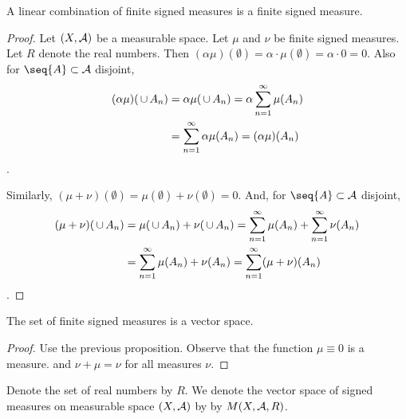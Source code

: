\begin{prop}
A linear combination of
finite signed measures is
a finite signed measure.
\begin{proof}
Let $(X,\mathcal{A})$ be a measurable space.
Let $\mu$ and $\nu$ be finite signed measures.
Let $R$ denote the real numbers.
Then $(\alpha\mu)(\emptyset) = \alpha \cdot \mu(\emptyset) = \alpha \cdot 0 = 0$.
Also for $\seq{A} \subset \SA$ disjoint,
$$
\begin{aligned}
  (\alpha\mu)(\,\cup\, A_n) &= \alpha \mu(\,\cup\, A_n)
  = \alpha \sum_{n = 1}^{\infty} \mu(A_n) \\ &= \sum_{n = 1}^{\infty} \alpha \mu(A_n) = (\alpha\mu)(A_n)
\end{aligned}
$$.

Similarly,
$(\mu + \nu)(\emptyset) = \mu(\emptyset) + \nu(\emptyset) = 0$.
And,
for $\seq{A} \subset \SA$ disjoint,
$$
\begin{aligned}
  (\mu + \nu)(\,\cup\, A_n) &= \mu(\,\cup\, A_n) + \nu(\,\cup\, A_n)
  = \sum_{n = 1}^{\infty} \mu(A_n) +
  \sum_{n = 1}^{\infty} \nu(A_n) \\
  &= \sum_{n = 1}^{\infty} \mu(A_n) + \nu(A_n)
  = \sum_{n = 1}^{\infty} (\mu + \nu)(A_n)
\end{aligned}
$$.
\end{proof}
\end{prop}


\begin{prop}
  The set of finite signed
  measures is a vector space.
  \begin{proof}
    Use the previous proposition.
    Observe that the function
    $\mu \equiv 0$ is a measure.
    and $\nu + \mu = \nu$ for
    all measures $\nu$.
  \end{proof}
\end{prop}

Denote the set of real
numbers by $R$.
We denote the vector
space of signed measures
on measurable space
$(X, \mathcal{A})$ by
by $M(X, \mathcal{A}, R)$.
\strats
